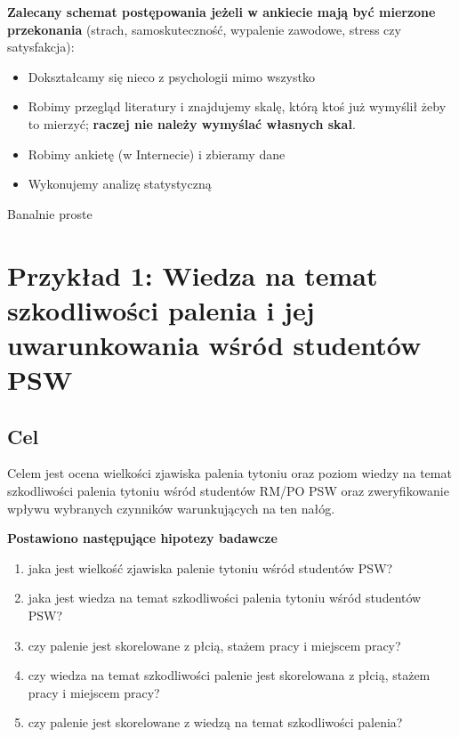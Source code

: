 \documentclass[
  openany]{book}
\begin{document}
\textbf{Zalecany schemat postępowania jeżeli w ankiecie mają być mierzone
przekonania} (strach, samoskuteczność, wypalenie zawodowe, stress czy satysfakcja):

\begin{itemize}
\item
  Dokształcamy się nieco z psychologii mimo wszystko
\item
  Robimy przegląd literatury i znajdujemy skalę, którą ktoś już wymyślił żeby
  to mierzyć; \textbf{raczej nie należy wymyślać własnych skal}.
\item
  Robimy ankietę (w Internecie) i zbieramy dane
\item
  Wykonujemy analizę statystyczną
\end{itemize}

Banalnie proste

\hypertarget{przykux142ad-1-wiedza-na-temat-szkodliwoux15bci-palenia-i-jej-uwarunkowania-wux15bruxf3d-studentuxf3w-psw}{%
\section{Przykład 1: Wiedza na temat szkodliwości palenia i jej uwarunkowania wśród studentów PSW}\label{przykux142ad-1-wiedza-na-temat-szkodliwoux15bci-palenia-i-jej-uwarunkowania-wux15bruxf3d-studentuxf3w-psw}}

\hypertarget{cel}{%
\subsection{Cel}\label{cel}}

Celem jest ocena wielkości zjawiska palenia tytoniu oraz
poziom wiedzy na temat szkodliwości palenia tytoniu
wśród
studentów RM/PO PSW oraz zweryfikowanie wpływu wybranych czynników warunkujących na ten nałóg.

\textbf{Postawiono następujące hipotezy badawcze}

\begin{enumerate}
\def\labelenumi{\arabic{enumi}.}
\item
  jaka jest wielkość zjawiska palenie tytoniu wśród studentów PSW?
\item
  jaka jest wiedza na temat szkodliwości palenia tytoniu wśród studentów PSW?
\item
  czy palenie jest skorelowane z płcią, stażem pracy i miejscem pracy?
\item
  czy wiedza na temat szkodliwości palenie jest skorelowana z płcią, stażem pracy i miejscem pracy?
\item
  czy palenie jest skorelowane z wiedzą na temat szkodliwości palenia?
\end{enumerate}
\end{document}
